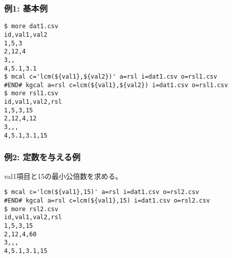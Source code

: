 \subsubsection*{例1: 基本例}



\begin{Verbatim}[baselinestretch=0.7,frame=single]
$ more dat1.csv
id,val1,val2
1,5,3
2,12,4
3,,
4,5.1,3.1
$ mcal c='lcm(${val1},${val2})' a=rsl i=dat1.csv o=rsl1.csv
#END# kgcal a=rsl c=lcm(${val1},${val2}) i=dat1.csv o=rsl1.csv
$ more rsl1.csv
id,val1,val2,rsl
1,5,3,15
2,12,4,12
3,,,
4,5.1,3.1,15
\end{Verbatim}
\subsubsection*{例2: 定数を与える例}

val1項目と15の最小公倍数を求める。


\begin{Verbatim}[baselinestretch=0.7,frame=single]
$ mcal c='lcm(${val1},15)' a=rsl i=dat1.csv o=rsl2.csv
#END# kgcal a=rsl c=lcm(${val1},15) i=dat1.csv o=rsl2.csv
$ more rsl2.csv
id,val1,val2,rsl
1,5,3,15
2,12,4,60
3,,,
4,5.1,3.1,15
\end{Verbatim}
